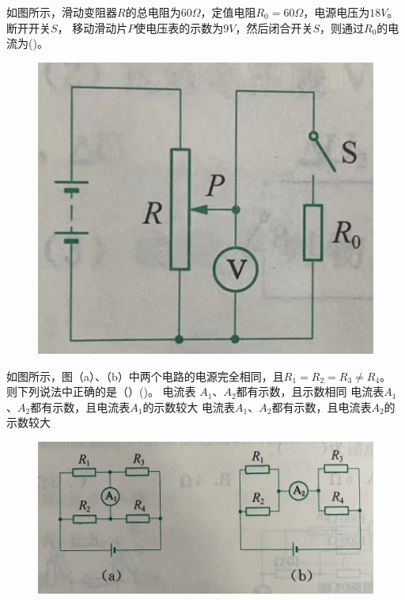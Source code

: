 \documentclass[a4paper,cs4size]{BHCexam}
\begin{document}
\begin{groups}
\begin{questions}[]
        \question[5]如图所示，滑动变阻器$R$的总电阻为$60\Omega$，定值电阻$R_0=60\Omega$，电源电压为$18V$。断开开关$S$，
        移动滑动片$P$使电压表的示数为$9V$，然后闭合开关$S$，则通过$R_0$的电流为(\quad\quad\quad)。
        \begin{figure}[htb]
            \flushright
            \includegraphics [scale=0.35,trim=0 0 0 0]{./image/physics_circuit2_7.png}
            \label{fig:fig_circuit2_7}
        \end{figure}
        \vspace{2.5cm}

        \question[5]如图所示，图（a）、（b）中两个电路的电源完全相同，且$R_1=R_2=R_3\neq R_4$。
        则下列说法中正确的是（）(\quad\quad\quad)。
        {电流表 $A_1$、$A_2$都有示数，且示数相同}
        {电流表$A_1$、$A_2$都有示数，且电流表$A_1$的示数较大}
        {电流表$A_1$、$A_2$都有示数，且电流表$A_2$的示数较大}
        \begin{figure}[htb]
            \flushright
            \includegraphics [scale=0.35,trim=0 0 0 0]{./image/physics_circuit2_8.png}
            \label{fig:fig_circuit2_8}
        \end{figure}
        \vspace{2.5cm}




\end{questions}
\end{groups}
\end{document}
